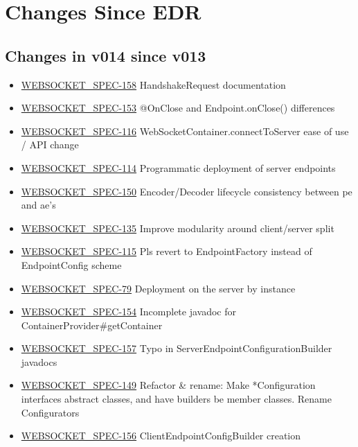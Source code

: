 \chapter{Changes Since EDR}

\section*{Changes in v014 since v013}

\begin{itemize}
\item \href {http://java.net/jira/browse/WEBSOCKET_SPEC-158}{WEBSOCKET\_SPEC-158} HandshakeRequest documentation
\item \href {http://java.net/jira/browse/WEBSOCKET_SPEC-153}{WEBSOCKET\_SPEC-153} @OnClose and Endpoint.onClose() differences
\item \href {http://java.net/jira/browse/WEBSOCKET_SPEC-116}{WEBSOCKET\_SPEC-116} WebSocketContainer.connectToServer ease of use / API change
\item \href {http://java.net/jira/browse/WEBSOCKET_SPEC-114}{WEBSOCKET\_SPEC-114} Programmatic deployment of server endpoints
\item \href {http://java.net/jira/browse/WEBSOCKET_SPEC-150}{WEBSOCKET\_SPEC-150} Encoder/Decoder lifecycle consistency between pe and ae's
\item \href {http://java.net/jira/browse/WEBSOCKET_SPEC-135}{WEBSOCKET\_SPEC-135} Improve modularity around client/server split
\item \href {http://java.net/jira/browse/WEBSOCKET_SPEC-115}{WEBSOCKET\_SPEC-115} Pls revert to EndpointFactory instead of EndpointConfig scheme
\item \href {http://java.net/jira/browse/WEBSOCKET_SPEC-79}{WEBSOCKET\_SPEC-79} Deployment on the server by instance
\item \href {http://java.net/jira/browse/WEBSOCKET_SPEC-154}{WEBSOCKET\_SPEC-154} Incomplete javadoc for ContainerProvider\#getContainer
\item \href {http://java.net/jira/browse/WEBSOCKET_SPEC-157}{WEBSOCKET\_SPEC-157} Typo in ServerEndpointConfigurationBuilder javadocs
\item \href {http://java.net/jira/browse/WEBSOCKET_SPEC-149}{WEBSOCKET\_SPEC-149} Refactor \& rename: Make *Configuration interfaces abstract classes, and have builders be member classes. Rename Configurators
\item \href {http://java.net/jira/browse/WEBSOCKET_SPEC-156}{WEBSOCKET\_SPEC-156} ClientEndpointConfigBuilder creation

\end{itemize}
